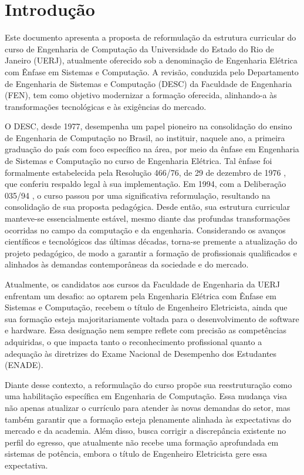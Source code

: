 \chapter{Introdução}
\thispagestyle{plain}
\label{intro} %

Este documento apresenta a proposta de reformulação da estrutura curricular do curso de Engenharia de Computação da Universidade do Estado do Rio de Janeiro (UERJ), atualmente oferecido sob a denominação de Engenharia Elétrica com Ênfase em Sistemas e Computação. A revisão, conduzida pelo Departamento de Engenharia de Sistemas e Computação (DESC) da Faculdade de Engenharia (FEN), tem como objetivo modernizar a formação oferecida, alinhando-a às transformações tecnológicas e às exigências do mercado.

O DESC, desde 1977, desempenha um papel pioneiro na consolidação do ensino de Engenharia de Computação no Brasil, ao instituir, naquele ano, a primeira graduação do país com foco específico na área, por meio da ênfase em Engenharia de Sistemas e Computação no curso de Engenharia Elétrica. Tal ênfase foi formalmente estabelecida pela Resolução  466/76, de 29 de dezembro de 1976 \cite{uerj1976}, que conferiu respaldo legal à sua implementação. Em 1994, com a Deliberação  035/94 \cite{uerj1994}, o curso passou por uma significativa reformulação, resultando na consolidação de sua proposta pedagógica. Desde então, sua estrutura curricular manteve-se essencialmente estável, mesmo diante das profundas transformações ocorridas no campo da computação e da engenharia. Considerando os avanços científicos e tecnológicos das últimas décadas, torna-se premente a atualização do projeto pedagógico, de modo a garantir a formação de profissionais qualificados e alinhados às demandas contemporâneas da sociedade e do mercado.

Atualmente, os candidatos aos cursos da Faculdade de Engenharia da UERJ enfrentam um desafio: ao optarem pela Engenharia Elétrica com Ênfase em Sistemas e Computação, recebem o título de Engenheiro Eletricista, ainda que sua formação esteja majoritariamente voltada para o desenvolvimento de software e hardware. Essa designação nem sempre reflete com precisão as competências adquiridas, o que impacta tanto o reconhecimento profissional quanto a adequação às diretrizes do Exame Nacional de Desempenho dos Estudantes (ENADE).

Diante desse contexto, a reformulação do curso propõe sua reestruturação como uma habilitação específica em Engenharia de Computação. Essa mudança visa não apenas atualizar o currículo para atender às novas demandas do setor, mas também garantir que a formação esteja plenamente alinhada às expectativas do mercado e da academia. Além disso, busca corrigir a discrepância existente no perfil do egresso, que atualmente não recebe uma formação aprofundada em sistemas de potência, embora o título de Engenheiro Eletricista gere essa expectativa.

